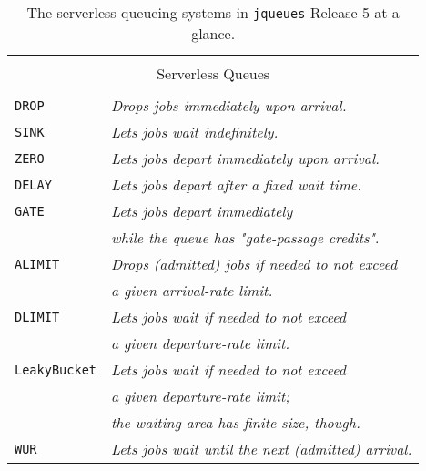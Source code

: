 \begin{table}[!htbp]
	\label{tab:serverless-queues}
	\caption{The serverless queueing systems
             in \texttt{jqueues} Release 5
             at a glance.}
	\begin{center}
		\begin{tabular}{|l|l|}
			\hline
			\multicolumn{2}{|c|}{} \\
			\multicolumn{2}{|c|}{Serverless Queues} \\
			\multicolumn{2}{|c|}{} \\
			\hline
            \hline
			\lstinline|DROP|
              &
              {\em Drops jobs immediately upon arrival.}
              \\ \hline
			\lstinline|SINK|
              &
              {\em Lets jobs wait indefinitely.}
              \\ \hline
			\lstinline|ZERO|
              &
              {\em Lets jobs depart immediately upon arrival.}
              \\ \hline
			\lstinline|DELAY|
              &
              {\em Lets jobs depart after a fixed wait time.}
              \\ \hline
			\lstinline|GATE|
              &
              {\em Lets jobs depart immediately}
              \\
              &
              {\em while the queue has "gate-passage credits"}.
              \\ \hline
			\lstinline|ALIMIT|
              &
              {\em Drops (admitted) jobs if needed to not exceed} 
              \\
              &
              {\em a given arrival-rate limit.} 
              \\ \hline
			\lstinline|DLIMIT|
              &
              {\em Lets jobs wait if needed to not exceed} 
              \\
              &
              {\em a given departure-rate limit.} 
              \\ \hline
			\lstinline|LeakyBucket|
              &
              {\em Lets jobs wait if needed to not exceed} 
              \\
              &
              {\em a given departure-rate limit;} 
              \\
              &
              {\em the waiting area has finite size, though.} 
              \\ \hline
			\lstinline|WUR|
              &
              {\em Lets jobs wait until
                   the next (admitted) arrival.} 
              \\ \hline
		\end{tabular}
	\end{center}
\end{table}

